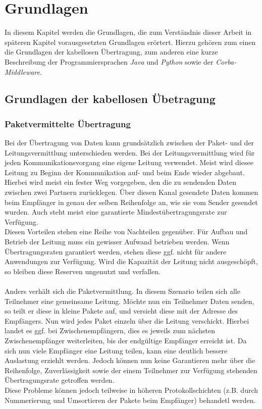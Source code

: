 
\chapter{Grundlagen}\label{Grundlagen}

In diesem Kapitel werden die Grundlagen, die zum Verständnis dieser Arbeit in späteren Kapitel vorausgesetzten Grundlagen
erörtert. Hierzu gehören zum einen die Grundlagen der kabellosen Übertragung, zum anderen eine kurze Beschreibung der
Programmiersprachen \emph{Java} und \emph{Python} sowie der \emph{Corba-Middleware}. 

\section{Grundlagen der kabellosen Übetragung}
    \subsection{Paketvermittelte Übertragung}
        Bei der Übertragung von Daten kann grundsätzlich zwischen der Paket- und der Leitungsvermittlung unterschieden 
        werden. Bei der Leitungsvermittlung wird für jeden Kommunikationsvorgang eine eigene Leitung verwendet. 
        Meist wird diesee Leitung zu Beginn der Kommunikation auf- und beim Ende wieder abgebaut. Hierbei wird
        meist ein fester Weg vorgegeben, den die zu sendenden Daten zwischen zwei Partnern zurücklegen. Über diesen Kanal
        gesendete Daten kommen beim Empfänger in genau der selben Reihenfolge an, wie sie vom Sender gesendet wurden.
        Auch steht meist eine garantierte Mindestübertragungsrate zur Verfügung. \\
        Diesen Vorteilen stehen eine Reihe von Nachteilen gegenüber. Für Aufbau und Betrieb der Leitung muss ein gewisser
        Aufwand betrieben werden. Wenn Übertragungsraten garantiert werden, stehen diese ggf. nicht für andere 
        Anwendungen zur Verfügung. Wird die Kapazität der Leitung nicht ausgeschöpft, so bleiben diese Reserven 
        ungenutzt und verfallen.\\
        \\
        Anders verhält sich die Paketvermittlung. In diesem Szenario teilen sich alle Teilnehmer eine gemeinsame
        Leitung. Möchte nun ein Teilnehmer Daten senden, so teilt er diese in kleine Pakete auf, und versieht diese
        mit der Adresse des Empfängers. Nun wird jedes Paket einzeln über die Leitung verschickt. Hierbei landet
        es ggf. bei Zwischenempfängern, dies es jeweils zum nächsten Zwischenempfänger weiterleiten, bis der
        endgültige Empfänger erreicht ist. Da sich nun viele Empfänger eine Leitung teilen, kann eine deutlich bessere
        Auslastung erziehlt werden. Jedoch können nun keine Garantieren mehr über die Reihenfolge, Zuverlässigkeit
        sowie der einem Teilnehmer zur Verfügung stehenden Übertragungsrate getroffen werden.\\
        Diese Probleme können jedoch teilweise in höheren Protokollschichten (z.B. durch Nummerierung und Umsortieren 
        der Pakete beim Empfänger) behandetl werden.

